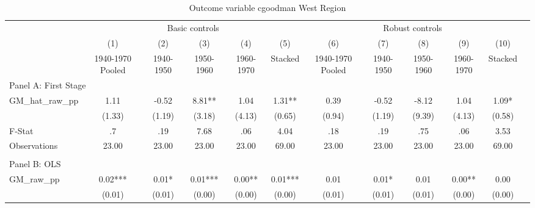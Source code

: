  \begin{table}[htbp]\centering {} \begin{threeparttable} \caption{Outcome variable cgoodman West Region} \begin{tabular}{l*{11}{c}} \toprule
          &\multicolumn{5}{c}{Basic controls}                                   &\multicolumn{5}{c}{Robust controls}                                  \\\cmidrule(lr){2-6}\cmidrule(lr){7-11}
          &\multicolumn{1}{c}{(1)}&\multicolumn{1}{c}{(2)}&\multicolumn{1}{c}{(3)}&\multicolumn{1}{c}{(4)}&\multicolumn{1}{c}{(5)}&\multicolumn{1}{c}{(6)}&\multicolumn{1}{c}{(7)}&\multicolumn{1}{c}{(8)}&\multicolumn{1}{c}{(9)}&\multicolumn{1}{c}{(10)}\\
          &\multicolumn{1}{c}{1940-1970 Pooled}&\multicolumn{1}{c}{1940-1950}&\multicolumn{1}{c}{1950-1960}&\multicolumn{1}{c}{1960-1970}&\multicolumn{1}{c}{Stacked}&\multicolumn{1}{c}{1940-1970 Pooled}&\multicolumn{1}{c}{1940-1950}&\multicolumn{1}{c}{1950-1960}&\multicolumn{1}{c}{1960-1970}&\multicolumn{1}{c}{Stacked}\\
\cmidrule(lr){1-11}
\multicolumn{10}{l}{Panel A: First Stage}\\
\cmidrule(lr){1-11}
GM\_hat\_raw\_pp&      1.11   &     -0.52   &      8.81** &      1.04   &      1.31** &      0.39   &     -0.52   &     -8.12   &      1.04   &      1.09*  \\
          &    (1.33)   &    (1.19)   &    (3.18)   &    (4.13)   &    (0.65)   &    (0.94)   &    (1.19)   &    (9.39)   &    (4.13)   &    (0.58)   \\
\midrule
F-Stat    &        .7   &       .19   &      7.68   &       .06   &      4.04   &       .18   &       .19   &       .75   &       .06   &      3.53   \\
Observations&     23.00   &     23.00   &     23.00   &     23.00   &     69.00   &     23.00   &     23.00   &     23.00   &     23.00   &     69.00   \\
\cmidrule[\heavyrulewidth](lr){1-11} \\ \cmidrule[\heavyrulewidth](lr){1-11}
\multicolumn{10}{l}{Panel B: OLS}\\
\cmidrule(lr){1-11}
GM\_raw\_pp &      0.02***&      0.01*  &      0.01***&      0.00** &      0.01***&      0.01   &      0.01*  &      0.01   &      0.00** &      0.00   \\
          &    (0.01)   &    (0.01)   &    (0.00)   &    (0.00)   &    (0.00)   &    (0.01)   &    (0.01)   &    (0.01)   &    (0.00)   &    (0.00)   \\

\end{tabular}
\end{threeparttable}
\end{table}
